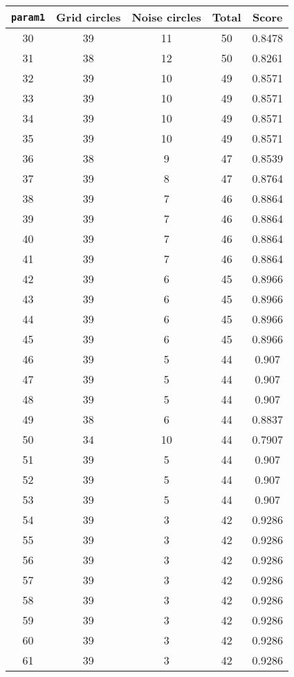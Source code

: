 \documentclass[letterpaper, 12pt]{article}
\begin{document}
\begin{longtable}{|c|c|c|c|c|}
\hline
\textbf{\texttt{param1}} & \textbf{Grid circles} & \textbf{Noise circles} & \textbf{Total} & \textbf{Score} \\
\hline
30 & 39 & 11 & 50 & 0.8478 \\
\hline
31 & 38 & 12 & 50 & 0.8261 \\
\hline
32 & 39 & 10 & 49 & 0.8571 \\
\hline
33 & 39 & 10 & 49 & 0.8571 \\
\hline
34 & 39 & 10 & 49 & 0.8571 \\
\hline
35 & 39 & 10 & 49 & 0.8571 \\
\hline
36 & 38 & 9 & 47 & 0.8539 \\
\hline
37 & 39 & 8 & 47 & 0.8764 \\
\hline
38 & 39 & 7 & 46 & 0.8864 \\
\hline
39 & 39 & 7 & 46 & 0.8864 \\
\hline
40 & 39 & 7 & 46 & 0.8864 \\
\hline
41 & 39 & 7 & 46 & 0.8864 \\
\hline
42 & 39 & 6 & 45 & 0.8966 \\
\hline
43 & 39 & 6 & 45 & 0.8966 \\
\hline
44 & 39 & 6 & 45 & 0.8966 \\
\hline
45 & 39 & 6 & 45 & 0.8966 \\
\hline
46 & 39 & 5 & 44 & 0.907 \\
\hline
47 & 39 & 5 & 44 & 0.907 \\
\hline
48 & 39 & 5 & 44 & 0.907 \\
\hline
49 & 38 & 6 & 44 & 0.8837 \\
\hline
50 & 34 & 10 & 44 & 0.7907 \\
\hline
51 & 39 & 5 & 44 & 0.907 \\
\hline
52 & 39 & 5 & 44 & 0.907 \\
\hline
53 & 39 & 5 & 44 & 0.907 \\
\hline
54 & 39 & 3 & 42 & 0.9286 \\
\hline
55 & 39 & 3 & 42 & 0.9286 \\
\hline
56 & 39 & 3 & 42 & 0.9286 \\
\hline
57 & 39 & 3 & 42 & 0.9286 \\
\hline
58 & 39 & 3 & 42 & 0.9286 \\
\hline
59 & 39 & 3 & 42 & 0.9286 \\
\hline
60 & 39 & 3 & 42 & 0.9286 \\
\hline
61 & 39 & 3 & 42 & 0.9286 \\

\end{longtable}
\end{document}
